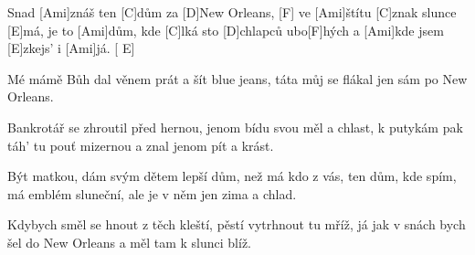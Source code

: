 
\sloka
Snad [Ami]znáš ten [C]dům za [D]New Orleans, [F]
ve [Ami]štítu [C]znak slunce [E]má,
je to [Ami]dům, kde [C]lká sto [D]chlapců ubo[F]hých
a [Ami]kde jsem [E]zkejs’ i [Ami]já. [ E]

\sloka
Mé mámě Bůh dal věnem
prát a šít blue jeans,
táta můj se flákal jen
sám po New Orleans.

\sloka
Bankrotář se zhroutil před hernou,
jenom bídu svou měl a chlast,
k putykám pak táh’ tu pouť mizernou
a znal jenom pít a krást.

\sloka
Být matkou, dám svým dětem
lepší dům, než má kdo z vás,
ten dům, kde spím, má emblém sluneční,
ale je v něm jen zima a chlad.

\sloka
Kdybych směl se hnout z těch kleští,
pěstí vytrhnout tu mříž,
já jak v snách bych šel do New Orleans
a měl tam k slunci blíž.
